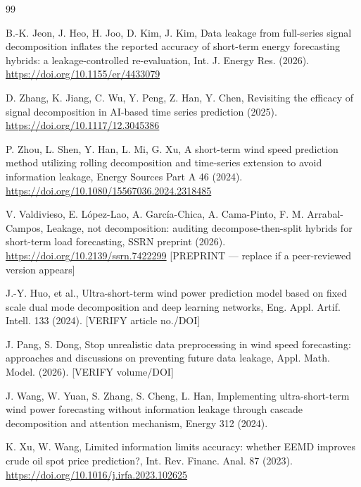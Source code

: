 \documentclass[review,3p,times]{elsarticle}
\begin{document}
\begin{thebibliography}{99}

B.-K. Jeon, J. Heo, H. Joo, D. Kim, J. Kim,
Data leakage from full-series signal decomposition inflates the reported
accuracy of short-term energy forecasting hybrids: a leakage-controlled
re-evaluation,
Int. J. Energy Res. (2026).
\url{https://doi.org/10.1155/er/4433079}

D. Zhang, K. Jiang, C. Wu, Y. Peng, Z. Han, Y. Chen,
Revisiting the efficacy of signal decomposition in AI-based time series
prediction (2025).
\url{https://doi.org/10.1117/12.3045386}

P. Zhou, L. Shen, Y. Han, L. Mi, G. Xu,
A short-term wind speed prediction method utilizing rolling decomposition and
time-series extension to avoid information leakage,
Energy Sources Part A 46 (2024).
\url{https://doi.org/10.1080/15567036.2024.2318485}

V. Valdivieso, E. López-Lao, A. García-Chica, A. Cama-Pinto,
F. M. Arrabal-Campos,
Leakage, not decomposition: auditing decompose-then-split hybrids for
short-term load forecasting, SSRN preprint (2026).
\url{https://doi.org/10.2139/ssrn.7422299}
\textsf{[PREPRINT --- replace if a peer-reviewed version appears]}

J.-Y. Huo, et al.,
Ultra-short-term wind power prediction model based on fixed scale dual mode
decomposition and deep learning networks,
Eng. Appl. Artif. Intell. 133 (2024). \textsf{[VERIFY article no./DOI]}

J. Pang, S. Dong,
Stop unrealistic data preprocessing in wind speed forecasting: approaches and
discussions on preventing future data leakage,
Appl. Math. Model. (2026). \textsf{[VERIFY volume/DOI]}

J. Wang, W. Yuan, S. Zhang, S. Cheng, L. Han,
Implementing ultra-short-term wind power forecasting without information
leakage through cascade decomposition and attention mechanism,
Energy 312 (2024).

K. Xu, W. Wang,
Limited information limits accuracy: whether EEMD improves crude oil spot price
prediction?,
Int. Rev. Financ. Anal. 87 (2023).
\url{https://doi.org/10.1016/j.irfa.2023.102625}


\end{thebibliography}
\end{document}

